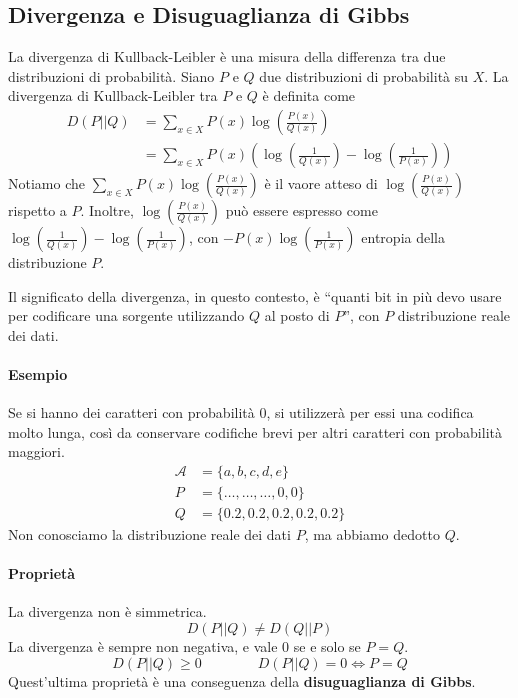 \subsection{Divergenza e Disuguaglianza di Gibbs}
La divergenza di Kullback-Leibler è una misura della differenza tra due distribuzioni di probabilità. Siano $P$ e $Q$ due distribuzioni di probabilità su $X$. La divergenza di Kullback-Leibler tra $P$ e $Q$ è definita come
\begin{align*}
    D(P||Q) &= \sum_{x\in X} P(x)\log\left(\frac{P(x)}{Q(x)}\right)\\
    &= \sum_{x\in X} P(x) \left( \log\left(\frac{1}{Q(x)}\right) - \log\left(\frac{1}{P(x)}\right) \right)
\end{align*}
Notiamo che $\sum_{x\in X} P(x)\log\left(\frac{P(x)}{Q(x)}\right)$ è il vaore atteso di $\log\left(\frac{P(x)}{Q(x)}\right)$ rispetto a $P$. Inoltre, $\log\left(\frac{P(x)}{Q(x)}\right)$ può essere espresso come $\log\left(\frac{1}{Q(x)}\right) - \log\left(\frac{1}{P(x)}\right)$, con $-P(x)\log\left(\frac{1}{P(x)}\right)$ entropia della distribuzione $P$.

Il significato della divergenza, in questo contesto, è ``quanti bit in più devo usare per codificare una sorgente utilizzando $Q$ al posto di $P$'', con $P$ distribuzione reale dei dati.

\paragraph{Esempio} Se si hanno dei caratteri con probabilità 0, si utilizzerà per essi una codifica molto lunga, così da conservare codifiche brevi per altri caratteri con probabilità maggiori.
\begin{align*}
    \mathcal{A} &= \{a,b,c,d,e\}\\
    P &= \{\dots,\dots,\dots,0,0\}\\
    Q &= \{0.2,0.2,0.2,0.2,0.2\}
\end{align*}
Non conosciamo la distribuzione reale dei dati $P$, ma abbiamo dedotto $Q$.

\paragraph{Proprietà} La divergenza non è simmetrica.
$$
    D(P||Q) \neq D(Q||P)
$$
La divergenza è sempre non negativa, e vale 0 se e solo se $P=Q$.
$$
    D(P||Q) \geq 0 \qquad\qquad D(P||Q) = 0 \Leftrightarrow P=Q
$$
Quest'ultima proprietà è una conseguenza della \textbf{disuguaglianza di Gibbs}.


